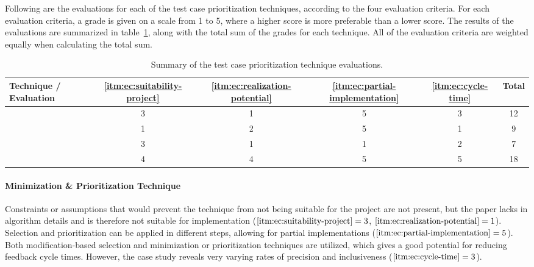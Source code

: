 \documentclass[a4paper,english,12pt]{report}
\begin{document}
Following are the evaluations for each of the test case prioritization techniques, according to the four evaluation criteria. For each evaluation criteria, a grade is given on a scale from 1 to 5, where a higher score is more preferable than a lower score. The results of the evaluations are summarized in table~\ref{tab:technique-evaluation}, along with the total sum of the grades for each technique. All of the evaluation criteria are weighted equally when calculating the total sum.

\begin{table}[htbp]
  \centering
  \begin{tabular}{|l|c|c|c|c|c|}
    \hline
      \textbf{Technique / Evaluation} & \textbf{\ref{itm:ec:suitability-project}} & \textbf{\ref{itm:ec:realization-potential}} & \textbf{\ref{itm:ec:partial-implementation}} & \textbf{\ref{itm:ec:cycle-time}} & \textbf{Total}\\
      \hline
      \citet{wong1997study} & 3 & 1 & 5 & 3 & 12 \\
      \hline
      \citet{malhotra2010regression} & 1 & 2 & 5 & 1 & 9 \\
      \hline
      \citet{rothermel1999testcase} & 3 & 1 & 1 & 2 & 7 \\
      \hline
      \citet{mansour2009regression} & 4 & 4 & 5 & 5 & 18 \\
    \hline
  \end{tabular}
  \caption{Summary of the test case prioritization technique evaluations.}
  \label{tab:technique-evaluation}
\end{table}

\paragraph{Minimization \& Prioritization Technique \citep{wong1997study}}
Constraints or assumptions that would prevent the technique from not being suitable for the project are not present, but the paper lacks in algorithm details and is therefore not suitable for implementation ($\text{\ref{itm:ec:suitability-project}} = 3$, $\text{\ref{itm:ec:realization-potential}} = 1$). Selection and prioritization can be applied in different steps, allowing for partial implementations ($\text{\ref{itm:ec:partial-implementation}} = 5$). Both modification-based selection and minimization or prioritization techniques are utilized, which gives a good potential for reducing feedback cycle times. However, the case study reveals very varying rates of precision and inclusiveness ($\text{\ref{itm:ec:cycle-time}} = 3$).
 
\end{document}
